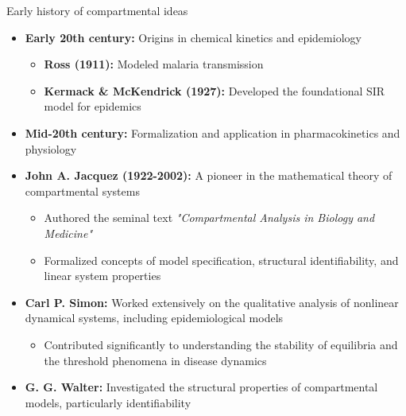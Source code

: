 \documentclass[aspectratio=169]{beamer}\usepackage[]{graphicx}\usepackage[]{xcolor}
\begin{document}
\begin{frame}{Early history of compartmental ideas}
    \begin{itemize}
        \item \textbf{Early 20th century:} Origins in chemical kinetics and epidemiology
        \begin{itemize}
            \item \textbf{Ross (1911):} Modeled malaria transmission
            \item \textbf{Kermack \& McKendrick (1927):} Developed the foundational SIR model for epidemics
        \end{itemize}
        \item \textbf{Mid-20th century:} Formalization and application in pharmacokinetics and physiology
        \item \textbf{John A. Jacquez (1922-2002):} A pioneer in the mathematical theory of compartmental systems
        \begin{itemize}
            \item Authored the seminal text \textit{"Compartmental Analysis in Biology and Medicine"}
            \item Formalized concepts of model specification, structural identifiability, and linear system properties
        \end{itemize}
        \item \textbf{Carl P. Simon:} Worked extensively on the qualitative analysis of nonlinear dynamical systems, including epidemiological models
        \begin{itemize}
            \item Contributed significantly to understanding the stability of equilibria and the threshold phenomena in disease dynamics
        \end{itemize}
        \item \textbf{G. G. Walter:} Investigated the structural properties of compartmental models, particularly identifiability
    \end{itemize}
\end{frame}
\end{document}
